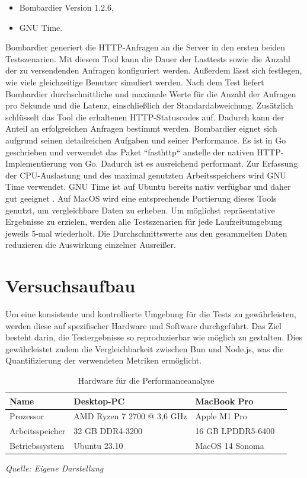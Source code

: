 \begin{itemize}
	\item Bombardier Version 1.2.6,
	\item GNU Time.
\end{itemize}

\noindent
Bombardier generiert die HTTP-Anfragen an die Server in den ersten beiden Testszenarien. Mit diesem Tool kann die Dauer der Lasttests sowie die Anzahl der zu versendenden Anfragen konfiguriert werden. Außerdem lässt sich festlegen, wie viele gleichzeitige Benutzer simuliert werden. Nach dem Test liefert Bombardier durchschnittliche und maximale Werte für die Anzahl der Anfragen pro Sekunde und die Latenz, einschließlich der Standardabweichung. Zusätzlich schlüsselt das Tool die erhaltenen HTTP-Statuscodes auf. Dadurch kann der Anteil an erfolgreichen Anfragen bestimmt werden. Bombardier eignet sich aufgrund seinen detailreichen Aufgaben und seiner Performance. Es ist in Go geschrieben und verwendet das Paket ``fasthttp`` anstelle der nativen HTTP-Implementierung von Go. Dadurch ist es ausreichend performant.\cite{Fedoseev.2016}\newline
Zur Erfassung der CPU-Auslastung und des maximal genutzten Arbeitsspeichers wird GNU Time verwendet. GNU Time ist auf Ubuntu bereits nativ verfügbar und daher gut geeignet \cite{FreeSoftwareFoundation.2018}. Auf MacOS wird eine entsprechende Portierung dieses Tools genutzt, um vergleichbare Daten zu erheben.\newline
Um möglichst repräsentative Ergebnisse zu erzielen, werden alle Testszenarien für jede Laufzeitumgebung jeweils 5-mal wiederholt. Die Durchschnittswerte aus den gesammelten Daten reduzieren die Auswirkung einzelner Ausreißer.


\section{Versuchsaufbau} \label{sec:performance-testSetup}
Um eine konsistente und kontrollierte Umgebung für die Tests zu gewährleisten, werden diese auf spezifischer Hardware und Software durchgeführt. Das Ziel besteht darin, die Testergebnisse so reproduzierbar wie möglich zu gestalten. Dies gewährleistet zudem die Vergleichbarkeit zwischen Bun und Node.js, was die Quantifizierung der verwendeten Metriken ermöglicht.

\begin{table}[h]
	\centering
	\begin{tabular}{|p{4.5cm}|p{4.5cm}|p{4.5cm}|p{4.5cm}|}
		\hline
		Name & Desktop-PC & MacBook Pro \\
		\hline
		Prozessor & AMD Ryzen 7 2700 @ 3,6 GHz & Apple M1 Pro \\
		\hline
		Arbeitsspeicher & 32 GB DDR4-3200 & 16 GB LPDDR5-6400 \\
		\hline
		Betriebssystem & Ubuntu 23.10 & MacOS 14 Sonoma \\
		\hline
	\end{tabular}
	\caption{Hardware für die Performanceanalyse}
	\label{table:hardware}
	\textit{Quelle: Eigene Darstellung}
\end{table}

